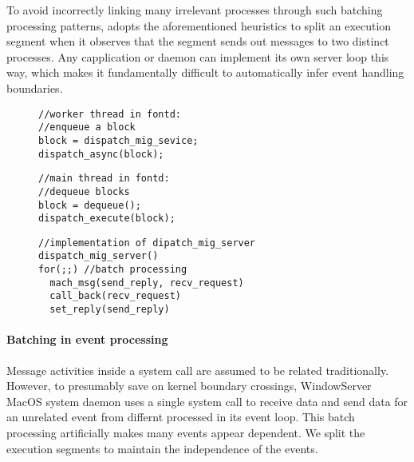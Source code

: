 To avoid incorrectly linking many irrelevant processes through such batching
processing patterns, \xxx adopts the aforementioned heuristics to split an
execution segment when it observes that the segment sends out messages to two
distinct processes. Any capplication or daemon can implement its own server loop
this way, which makes it fundamentally difficult to automatically infer event
handling boundaries.

\vspace{-4mm}
\begin{figure}[ht!]
\begin{minipage}[t]{.25\textwidth}
\begin{lstlisting}
//worker thread in fontd:
//enqueue a block
block = dispatch_mig_sevice;
dispatch_async(block);
\end{lstlisting}
\end{minipage}\hfill
\begin{minipage}[t]{.21\textwidth}
\begin{lstlisting}
//main thread in fontd:
//dequeue blocks
block = dequeue();
dispatch_execute(block);
\end{lstlisting}
\end{minipage}

\begin{minipage}[t]{0.48\textwidth}
\begin{lstlisting}
//implementation of dipatch_mig_server
dispatch_mig_server()
for(;;) //batch processing
  mach_msg(send_reply, recv_request)
  call_back(recv_request)
  set_reply(send_reply)
\end{lstlisting}
\end{minipage}
    \label{fig:dispatchmessagebatching}
\end{figure}
\vspace{-7mm}

\paragraph{Batching in event processing}

Message activities inside a system call are assumed to be related traditionally.
However, to presumably save on kernel boundary crossings, WindowServer MacOS
system daemon uses a single system call to receive data and send data for an
unrelated event from differnt processed in its event loop. This batch processing
artificially makes many events appear dependent. We split the execution segments
to maintain the independence of the events.

